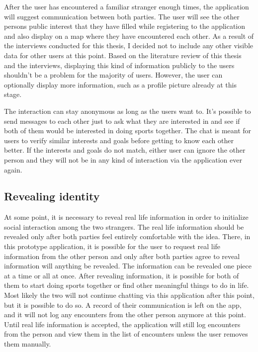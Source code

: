 After the user has encountered a familiar stranger enough times, the application will suggest communication between both parties. The user will see the other persons public interest that they have filled while registering to the application and also display on a map where they have encountered each other. As a result of the interviews conducted for this thesis, I decided not to include any other visible data for other users at this point. Based on the literature review of this thesis and the interviews, displaying this kind of information publicly to the users shouldn't be a problem for the majority of users. However, the user can optionally display more information, such as a profile picture already at this stage.

The interaction can stay anonymous as long as the users want to. It's possible to send messages to each other just to ask what they are interested in and see if both of them would be interested in doing sports together. The chat is meant for users to verify similar interests and goals before getting to know each other better. If the interests and goals do not match, either user can ignore the other person and they will not be in any kind of interaction via the application ever again.

\subsection{Revealing identity}

At some point, it is necessary to reveal real life information in order to initialize social interaction among the two strangers. The real life information should be revealed only after both parties feel entirely comfortable with the idea. There, in this prototype application, it is possible for the user to request real life information from the other person and only after both parties agree to reveal information will anything be revealed. The information can be revealed one piece at a time or all at once. After revealing information, it is possible for both of them to start doing sports together or find other meaningful things to do in life. Most likely the two will not continue chatting via this application after this point, but it is possible to do so. A record of their communication is left on the app, and it will not log any encounters from the other person anymore at this point. Until real life information is accepted, the application will still log encounters from the person and view them in the list of encounters unless the user removes them manually.

